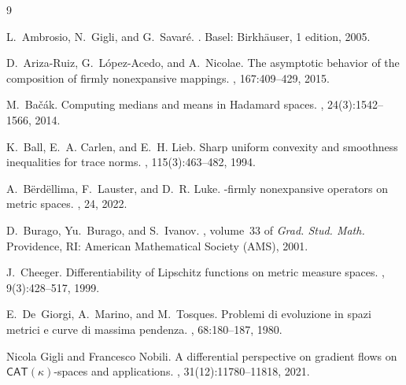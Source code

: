 \documentclass[11pt]{article}
\begin{document}
\begin{thebibliography}{9}

L.~Ambrosio, N.~Gigli, and G.~Savar{\'e}.
.
\newblock Basel: Birkh\"auser, 1 edition, 2005.

D.~{Ariza-Ruiz}, G.~{L{\'o}pez-Acedo}, and A.~Nicolae.
\newblock The asymptotic behavior of the composition of firmly nonexpansive
  mappings.
, 167:409--429, 2015.

M.~Ba{\v c}{\'a}k.
\newblock Computing medians and means in {{Hadamard}} spaces.
, 24(3):1542--1566, 2014.

K.~Ball, E.~A. Carlen, and E.~H. Lieb.
\newblock Sharp uniform convexity and smoothness inequalities for trace norms.
, 115(3):463--482, 1994.

A.~B{\"e}rd{\"e}llima, F.~Lauster, and D.~R. Luke.
\newblock {{$\alpha$}}-firmly nonexpansive operators on metric spaces.
, 24, 2022.

D.~Burago, {\relax Yu}.~Burago, and S.~Ivanov.
, volume~33 of {\em Grad. {{Stud}}.
  {{Math}}.}
\newblock Providence, RI: American Mathematical Society (AMS), 2001.

J.~Cheeger.
\newblock Differentiability of {{Lipschitz}} functions on metric measure
  spaces.
, 9(3):428--517, 1999.

E.~De~Giorgi, A.~Marino, and M.~Tosques.
\newblock Problemi di evoluzione in spazi metrici e curve di massima pendenza.
, 68:180--187, 1980.

Nicola Gigli and Francesco Nobili.
\newblock A differential perspective on gradient flows on
  {{\(\mathbf{\mathsf{CAT}} (\kappa)\)}}-spaces and applications.
, 31(12):11780--11818, 2021.

%
%
%


\end{thebibliography}
\end{document}

